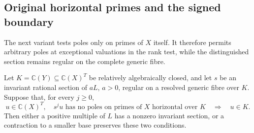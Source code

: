 \subsection{Original horizontal primes and the signed boundary}
\label{g:ba:signed}

The next variant tests poles only on primes of $X$ itself.
It therefore permits arbitrary poles at exceptional valuations in the
rank test, while the distinguished section remains regular on the
complete generic fibre.

\begin{proposition}\label{g:ba:original-primes}
Let $K=\mathbb C(Y)\subseteq\mathbb C(X)^T$ be relatively algebraically
closed, and let $s$ be an invariant rational section of $aL$, $a>0$, regular on
a resolved generic fibre over $K$.  Suppose that, for every $j\geq0$,
\begin{equation}\label{g:ba:original-rank}
 u\in\mathbb C(X)^T,\quad
 s^ju\text{ has no poles on primes of $X$ horizontal over $K$}
                  \quad\Longrightarrow\quad u\in K.
\end{equation}
Then either a positive multiple of $L$ has a nonzero invariant section,
or a contraction to a smaller base preserves these two conditions.
\end{proposition}

